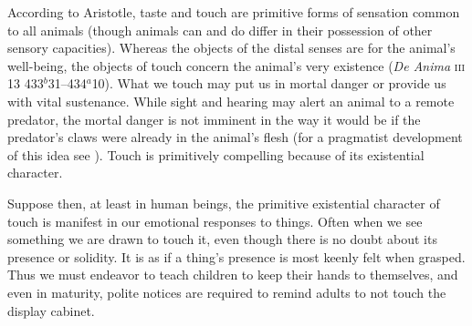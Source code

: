 According to Aristotle, taste and touch are primitive forms of sensation common to all animals (though animals can and do differ in their possession of other sensory capacities). Whereas the objects of the distal senses are for the animal's well-being, the objects of touch concern the animal's very existence (\emph{De Anima} \textsc{iii} 13 433\( ^{b} \)31--434\( ^{a} \)10). What we touch may put us in mortal danger or provide us with vital sustenance. While sight and hearing may alert an animal to a remote predator, the mortal danger is not imminent in the way it would be if the predator's claws were already in the animal's flesh (for a pragmatist development of this idea see \citealt[22--23]{Bergson:1912pi}). Touch is primitively compelling because of its existential character.

Suppose then, at least in human beings, the primitive existential character of touch is manifest in our emotional responses to things. Often when we see something we are drawn to touch it, even though there is no doubt about its presence or solidity. It is as if a thing's presence is most keenly felt when grasped. Thus we must endeavor to teach children to keep their hands to themselves, and even in maturity, polite notices are required to remind adults to not touch the display cabinet.

